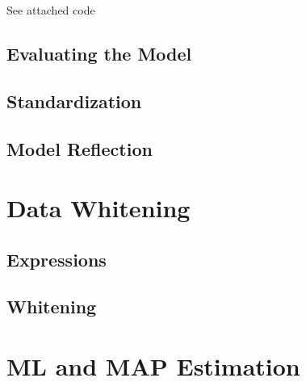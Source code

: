 \documentclass{article}
\begin{document}
See attached code

\subsection{Evaluating the Model}
\subsection{Standardization}
\subsection{Model Reflection}

\section{Data Whitening}

\subsection{Expressions}
\subsection{Whitening}

\section{ML and MAP Estimation}

\subsection{}
\subsection{}
\subsection{}
\end{document}
